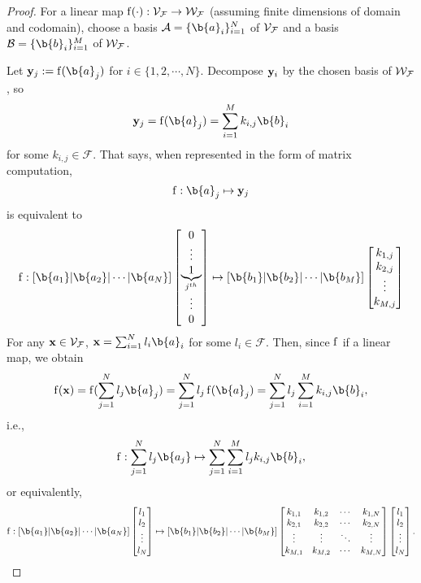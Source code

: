 \begin{proof} 
For a linear map $\operatorname{f}(\cdot): \mathcal{V}_{\mathcal{F}} \to \mathcal{W}_{\mathcal{F}}$  (assuming finite dimensions of domain and codomain), choose a basis $\mathcal{A} = \{\b{a}_i\}_{i=1}^N$ of $\mathcal{V}_{\mathcal{F}}$ and a basis $\mathcal{B} = \{\b{b}_i\}_{i=1}^M$ of $\mathcal{W}_{\mathcal{F}}$. 

Let $\y_j := \f(\b{a}_j)$ for $i \in \{1,2,\cdots,N\}$. 
Decompose $\mathbf{y}_i$ by the chosen basis of $\mathcal{W}_{\mathcal{F}}$, so $$\y_j = \f(\b{a}_j) = \sum_{i=1}^{M} k_{i,j}\b{b}_i$$ for some $k_{i,j} \in \mathcal{F}$. 
%
That says, when represented in the form of matrix computation,
$$\f: \b{a}_j \mapsto \y_j $$
is equivalent to 
$$\f:
\left[ \b{a_1} | \b{a_2}| \cdots |\b{a_N} \right]
\begin{bmatrix}
0 \\
\vdots \\
\underbrace{1}_{j^{th}} \\
\vdots \\
0
\end{bmatrix}
\mapsto 
\left[ \b{b_1} | \b{b_2}| \cdots |\b{b_M} \right]
\begin{bmatrix}
k_{1,j} \\
k_{2, j} \\
\vdots \\
 k_{M,j}
\end{bmatrix}
$$
%
For any $\mathbf{x} \in \mathcal{V}_{\mathcal{F}}$,  $\x =\sum_{i=1}^{N} l_i\b{a}_i$ for some $l_i \in \mathcal{F}$.
Then, since $\operatorname{f}$ if a linear map, we obtain
$$\f(\x) = \f(\sum_{j=1}^{N} l_j\b{a}_j) = \sum_{j=1}^{N} l_j \f(\b{a}_j) = \sum_{j=1}^{N} l_j \sum_{i=1}^{M} k_{i, j}\b{b}_i,$$
i.e.,
$$\f: \sum_{j=1}^{N} l_j\b{a_j} \mapsto \sum_{j=1}^{N} \sum_{i=1}^{M} l_j k_{i, j}\b{b}_i,$$
or equivalently,
$$\f:
\left[ \b{a_1} | \b{a_2}| \cdots |\b{a_N} \right]\begin{bmatrix}
l_1 \\
l_2 \\
\vdots \\
l_N
\end{bmatrix}
\mapsto 
\left[ \b{b_1} | \b{b_2}| \cdots |\b{b_M} \right]
\begin{bmatrix}
k_{1,1} &k_{1,2} &\cdots &k_{1,N} \\
k_{2,1} &k_{2,2} &\cdots &k_{2,N} \\
\vdots  &\vdots  &\ddots &\vdots  \\
k_{M,1} &k_{M,2} &\cdots &k_{M,N} 
\end{bmatrix}
\begin{bmatrix}
l_1 \\
l_2 \\
\vdots \\
l_N
\end{bmatrix}.
$$


\end{proof}
